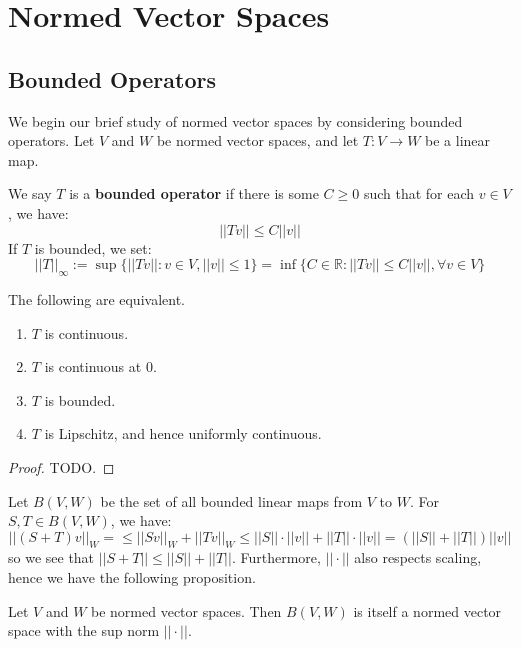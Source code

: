 	\section{Normed Vector Spaces}
	
	\subsection{Bounded Operators}
	
	We begin our brief study of normed vector spaces by considering bounded operators. Let $V$ and $W$ be normed 
	vector spaces, and let $T : V\rightarrow W$ be a linear map.
	
	\begin{definition}[Bounded]
		We say $T$ is a \textbf{bounded operator} if there is some $C\geq 0$ such that for each $v\in V$, we have:
		$$
			||Tv||\leq C||v||
		$$
		If $T$ is bounded, we set:
		$$
			||T||_\infty := \sup\{||Tv|| : v\in V, ||v||\leq 1\} = \inf\{C\in\mathbb R : ||Tv||\leq C||v||,\forall v\in V\}
		$$
	\end{definition}
	
	\begin{theorem}
		The following are equivalent.
		\begin{enumerate}
			\item $T$ is continuous.
			\item $T$ is continuous at $0$.
			\item $T$ is bounded.
			\item $T$ is Lipschitz, and hence uniformly continuous.
		\end{enumerate}
	\end{theorem}
	
	\begin{proof}
		TODO.
	\end{proof}
	
	Let $B(V, W)$ be the set of all bounded linear maps from $V$ to $W$. For $S, T\in B(V, W)$, we have:
	$$
		||(S + T)v||_W = \leq ||Sv||_W + ||Tv||_W\leq ||S||\cdot ||v|| + ||T||\cdot||v|| = (||S|| + ||T||)||v||
	$$
	so we see that $||S + T||\leq ||S|| + ||T||$. Furthermore, $||\cdot||$ also respects scaling, hence we have the following 
	proposition.
	
	\begin{theorem}
		Let $V$ and $W$ be normed vector spaces. Then $B(V, W)$ is itself a normed vector space with the sup norm 
		$||\cdot||$. 
	\end{theorem}
	
